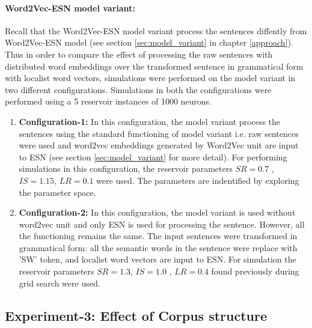 \paragraph{Word2Vec-ESN model variant:} Recall that the Word2Vec-ESN model variant process the sentences diffently from Word2Vec-ESN model (see section \ref{sec:model_variant} in chapter \ref{approach}). Thus in order to compare the effect of processing the raw sentences with distributed word embeddings over the transformed sentence in grammatical form with localist word vectors, simulations were performed on the model variant in two different configurations. Simulations in both the configurations were performed using a 5 reservoir instances of 1000 neurons.

\begin{enumerate}
\setlength{\itemsep}{\smallskipamount}

\item \textbf{Configuration-1: } In this configuration, the model variant process the sentences using the standard functioning of model variant i.e. raw sentences were used and word2vec embeddings generated by Word2Vec unit are input to ESN (see section \ref{sec:model_variant} for more detail). For performing simulations in this configuration, the reservoir parameters  $SR = 0.7$ , $IS = 1.15$, $LR = 0.1$ were used. The parameters are indentified by exploring the parameter space. \label{config-1}

\item \textbf{Configuration-2: } In this configuration, the model variant is used without word2vec unit and only ESN is used for processing the sentence. However, all the functioning remains the same. The input sentences were transformed in grammatical form: all the semantic words in the sentence were replace with 'SW' token, and localist word vectors are input to ESN. For simulation the reservoir parameters $SR = 1.3$, $IS = 1.0$ , $LR = 0.4$ found previously during grid search were used. \label{config-2}

\end{enumerate} 

\subsection{Experiment-3: Effect of Corpus structure} \label{exp-3}

